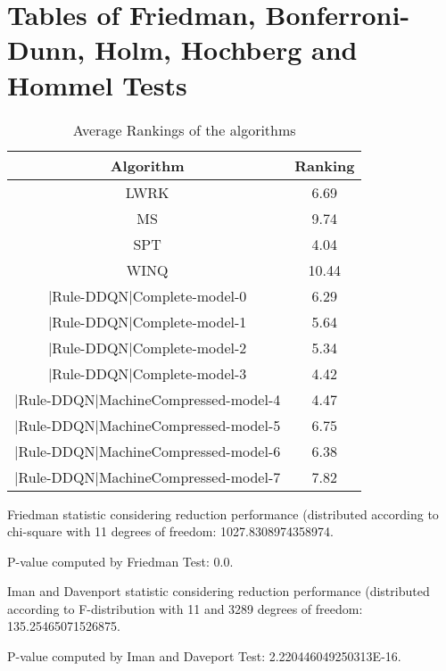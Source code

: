 \documentclass[a3paper,10pt]{article}
\author{}
\date{\today}
\begin{document}
\oddsidemargin 0in \topmargin 0in\maketitle
\section{Tables of Friedman, Bonferroni-Dunn, Holm, Hochberg and Hommel Tests}
\begin{table}[!htp]
\centering
\caption{Average Rankings of the algorithms
}\begin{tabular}{c|c}
Algorithm&Ranking\\
\hline
LWRK&6.69\\
MS&9.74\\
SPT&4.04\\
WINQ&10.44\\
|Rule-DDQN|Complete-model-0&6.29\\
|Rule-DDQN|Complete-model-1&5.64\\
|Rule-DDQN|Complete-model-2&5.34\\
|Rule-DDQN|Complete-model-3&4.42\\
|Rule-DDQN|MachineCompressed-model-4&4.47\\
|Rule-DDQN|MachineCompressed-model-5&6.75\\
|Rule-DDQN|MachineCompressed-model-6&6.38\\
|Rule-DDQN|MachineCompressed-model-7&7.82\\
\end{tabular}
\end{table}


Friedman statistic considering reduction performance (distributed according to chi-square with 11 degrees of freedom: 1027.8308974358974.


P-value computed by Friedman Test: 0.0.\newline

Iman and Davenport statistic considering reduction performance (distributed according to F-distribution with 11 and 3289 degrees of freedom: 135.25465071526875.


P-value computed by Iman and Daveport Test: 2.220446049250313E-16.\newline
\end{document}
